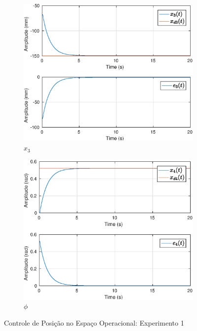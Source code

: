 \begin{figure}[H]
\begin{subfigure}{.5\textwidth}
  \centering
  \includegraphics[width=\linewidth]{./img/position1/x3.eps}
  \caption{$x_3$}
  \label{fig:oper_space_exp1_x3}
\end{subfigure}%
\begin{subfigure}{.5\textwidth}
  \centering
  \includegraphics[width=\linewidth]{./img/position1/x4.eps}
  \caption{$\phi$}
  \label{fig:oper_space_exp1_x4}
\end{subfigure}
\caption{Controle de Posição no Espaço Operacional: Experimento 1}
\label{fig:oper_space_exp1}
\end{figure}

